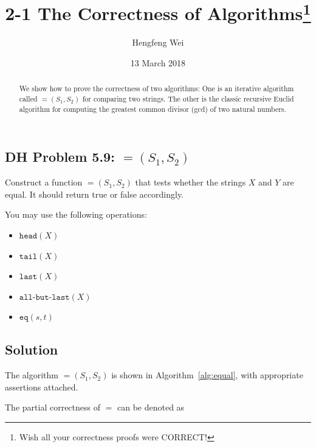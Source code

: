 \documentclass{tufte-handout}
\title{2-1 The Correctness of Algorithms\thanks{Wish all your correctness proofs were \uppercase{correct}!}}
\author[hengxin]{Hengfeng Wei}
\date{13 March 2018}  %
\begin{document}
\begin{CJK*}{UTF8}{gbsn}

\maketitle%

\begin{abstract}
\noindent We show how to prove the correctness of two algorithms:
One is an iterative algorithm called $\equal(S_1, S_2)$ for comparing two strings.
The other is the classic recursive Euclid algorithm for computing the greatest common divisor (gcd) of two natural numbers.
\end{abstract}


\section{DH Problem 5.9: $\equal(S_1, S_2)$}  \label{section:problem-5.9}
  Construct a function $\equal(S_1, S_2)$ that tests whether the strings $X$ and $Y$ are equal.
  It should return true or false accordingly.

  You may use the following operations:
  \begin{itemize}
    \item $\texttt{head}(X)$
    \item $\texttt{tail}(X)$
    \item $\texttt{last}(X)$
    \item $\texttt{all-but-last}(X)$
    \item $\texttt{eq}(s,t)$
  \end{itemize}

\subsection{Solution}


The algorithm $\equal(S_1, S_2)$ is shown in Algorithm~\ref{alg:equal},
with appropriate assertions attached.

The partial correctness of $\equal$ can be denoted as


\end{CJK*}
\end{document}
